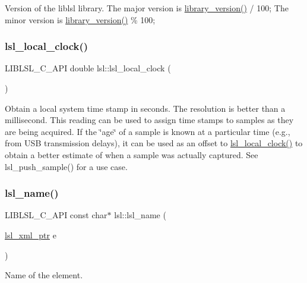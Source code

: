 Version of the liblsl library. The major version is \hyperlink{namespacelsl_a25fc4deea3c2fb0df0744e3a24c56844}{library\+\_\+version()} / 100; The minor version is \hyperlink{namespacelsl_a25fc4deea3c2fb0df0744e3a24c56844}{library\+\_\+version()} \% 100; \mbox{\label{namespacelsl_a475274f88a060924c9bd1b38879ec63a}} 
\subsubsection{\texorpdfstring{lsl\+\_\+local\+\_\+clock()}{lsl\_local\_clock()}}
{\footnotesize\ttfamily L\+I\+B\+L\+S\+L\+\_\+\+C\+\_\+\+A\+PI double lsl\+::lsl\+\_\+local\+\_\+clock (\begin{DoxyParamCaption}{ }\end{DoxyParamCaption})}

Obtain a local system time stamp in seconds. The resolution is better than a millisecond. This reading can be used to assign time stamps to samples as they are being acquired. If the \char`\"{}age\char`\"{} of a sample is known at a particular time (e.\+g., from U\+SB transmission delays), it can be used as an offset to \hyperlink{namespacelsl_a475274f88a060924c9bd1b38879ec63a}{lsl\+\_\+local\+\_\+clock()} to obtain a better estimate of when a sample was actually captured. See lsl\+\_\+push\+\_\+sample() for a use case. \mbox{\label{namespacelsl_a55761eae47f0963850f6077b4c61701e}} 
\subsubsection{\texorpdfstring{lsl\+\_\+name()}{lsl\_name()}}
{\footnotesize\ttfamily L\+I\+B\+L\+S\+L\+\_\+\+C\+\_\+\+A\+PI const char$\ast$ lsl\+::lsl\+\_\+name (\begin{DoxyParamCaption}\item[{\hyperlink{namespacelsl_a5edc7a49a1a1be1634fe6dce3d59c59b}{lsl\+\_\+xml\+\_\+ptr}}]{e }\end{DoxyParamCaption})}

Name of the element. \mbox{\label{namespacelsl_ad719cddda958c613ff328245dc5b4277}} 
